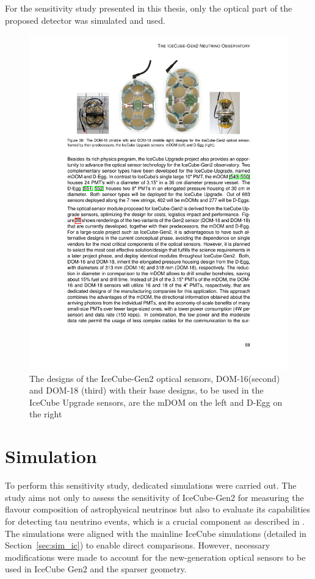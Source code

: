 For the sensitivity study presented in this thesis, only the optical part of the proposed detector was simulated and used. 

\begin{figure}
	\includegraphics[scale=2.2]{./figures/gen2/Gen2_DOMs.pdf}
	\caption{The designs of the IceCube-Gen2 optical sensors, DOM-16(second) and DOM-18 (third) with their base designs, to be used in the IceCube Upgrade sensors, are the mDOM on the left and D-Egg on the right \cite{Gen2_TDR}}
\end{figure}

\section{Simulation}
\label{sec:gen2-sim}
To perform this sensitivity study, dedicated simulations were carried out. The study aims not only to assess the sensitivity of IceCube-Gen2 for measuring the flavour composition of astrophysical neutrinos but also to evaluate its capabilities for detecting tau neutrino events, which is a crucial component as described in . The simulations were aligned with the mainline IceCube simulations (detailed in Section~\ref{sec:sim_ic}) to enable direct comparisons. However, necessary modifications were made to account for the new-generation optical sensors to be used in IceCube Gen2 and the sparser geometry. 

